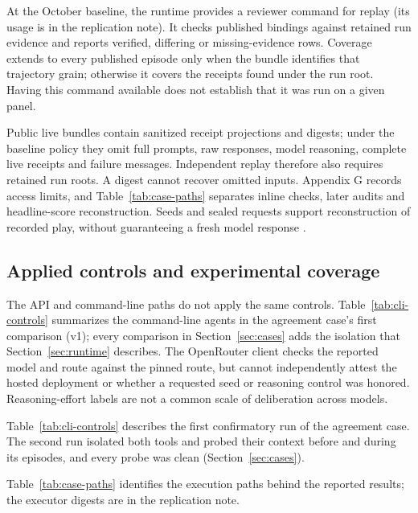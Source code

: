 At the October baseline, the runtime provides a reviewer command for replay (its usage is in the
replication note). It checks published bindings against retained run evidence and reports
verified, differing or missing-evidence rows. Coverage extends to every
published episode only when the bundle identifies that trajectory grain;
otherwise it covers the receipts found under the run root. Having this
command available does not establish that it was run on a given panel.

Public live bundles contain sanitized receipt projections and digests;
under the baseline policy they omit full prompts, raw responses, model reasoning,
complete live receipts and failure messages. Independent replay therefore
also requires retained run roots. A digest cannot recover omitted inputs.
Appendix G records access limits, and Table~\ref{tab:case-paths} separates
inline checks, later audits and headline-score reconstruction. Seeds and
sealed requests support reconstruction of recorded play, without
guaranteeing a fresh model response \citep{he2025nondeterminism}.

\subsection{Applied controls and experimental coverage}
\label{app:runtime-cases}

The API and command-line paths do not apply the same controls. Table~\ref{tab:cli-controls}
summarizes the command-line agents in the agreement case's first comparison (v1); every comparison in Section~\ref{sec:cases} adds the isolation that Section~\ref{sec:runtime} describes. The OpenRouter
client checks the reported model and route against the pinned
route, but cannot independently attest the hosted deployment or whether a
requested seed or reasoning control was honored. Reasoning-effort labels
are not a common scale of deliberation across models.



Table~\ref{tab:cli-controls} describes the first confirmatory run of the agreement case. The
second run isolated both tools and probed their context before and during its
episodes, and every probe was clean (Section~\ref{sec:cases}).

Table~\ref{tab:case-paths} identifies the execution paths behind the reported
results; the executor digests are in the replication note.




